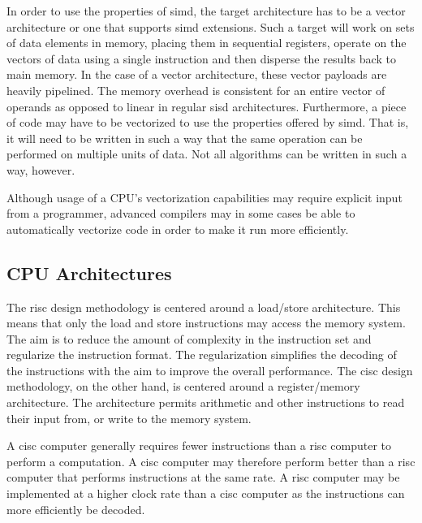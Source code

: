In order to use the properties of \gls{simd}, the target architecture has to be a vector architecture or one that supports \gls{simd} extensions. Such a target will work on sets of data elements in memory, placing them in sequential registers, operate on the vectors of data using a single instruction and then disperse the results back to main memory. In the case of a vector architecture, these vector payloads are heavily pipelined. The memory overhead is consistent for an entire vector of operands as opposed to linear in regular \gls{sisd} architectures\cite{hennessy2011:vectorization}. Furthermore, a piece of code may have to be vectorized to use the properties offered by \gls{simd}. That is, it will need to be written in such a way that the same operation can be performed on multiple units of data. Not all algorithms can be written in such a way, however\cite{dickson2011}.

Although usage of a CPU's vectorization capabilities may require explicit input from a programmer, advanced compilers may in some cases be able to automatically vectorize code in order to make it run more efficiently\cite{dickson2011}.

\subsection{CPU Architectures}


The \acrfull{risc} design methodology is centered around a load/store architecture\cite{flynn1998}. This means that only the load and store instructions may access the memory system\cite{carter2002}. The aim is to reduce the amount of complexity in the instruction set and regularize the instruction format. The regularization simplifies the decoding of the instructions with the aim to improve the overall performance\cite{flynn1998}. The \acrfull{cisc} design methodology, on the other hand, is centered around a register/memory architecture\cite{flynn1998}. The architecture permits arithmetic and other instructions to read their input from, or write to the memory system\cite{carter2002}.

A \gls{cisc} computer generally requires fewer instructions than a \gls{risc} computer to perform a computation. A \gls{cisc} computer may therefore perform better than a \gls{risc} computer that performs instructions at the same rate. A \gls{risc} computer may be implemented at a higher clock rate than a \gls{cisc} computer as the instructions can more efficiently be decoded\cite{carter2002}.

